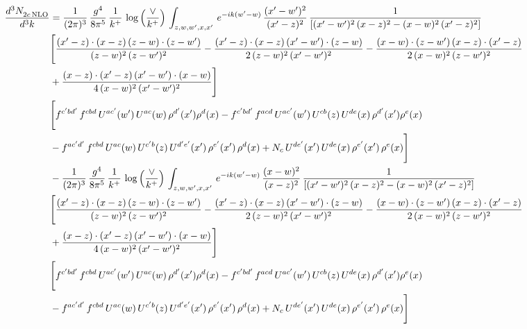 \documentclass[9pt]{article}
\numberwithin{equation}{section}
\begin{document}
\begin{align}
    \frac{d^{3}N_{2c\,\rm NLO}^{\rm}}{d^{3}k}  & =  \frac{1}{(2\pi)^{3}}\, \frac{g^{4}}{8\pi^{5}}\,\frac{1}{k^{+}}\,\log{\left(\frac{\vee}{k^{+}}\right)} \,\int_{z,w,w^{\prime},x,x'}\, e^{-ik(w^{\prime}-w)}\,\frac{(x'-w')^{2}}{(x'-z)^{2}}\, \frac{1}{\left[(x'-w')^{2}\, (x-z)^{2} - (x-w)^{2}\, (x'-z)^{2}\right]} \notag \\ & \Bigg[\frac{(x'-z)\cdot (x-z)\, (z-w)\cdot (z-w')}{(z-w)^{2}\, (z-w')^{2}}-\frac{(x'-z)\cdot (x-z)\, (x'-w')\cdot (z-w)}{2\, (z-w)^{2}\, (x'-w')^{2}} -\frac{(x-w)\cdot (z-w')\, (x-z)\cdot (x'-z)}{2\, (x-w)^{2}\, (z-w')^{2}}\notag \\ & +\frac{(x-z)\cdot (x'-z)\, (x'-w')\cdot (x-w)}{4\, (x-w)^{2}\, (x'-w')^{2}}\Bigg]\notag \\ &  \Bigg[f^{c'bd'}\,f^{cbd}\, U^{ac'}(w')\,U^{ac}(w)\,\rho^{d'}(x')\rho^{d}(x)- f^{c'bd'}\,f^{acd}\,U^{ac'}(w')\,U^{cb}(z)\,U^{de}(x)\,\rho^{d'}(x')\rho^{e}(x) \notag \\ & -f^{ac'd'}\,f^{cbd}\,U^{ac}(w)\,U^{c'b}(z)\,U^{d'e'}(x')\,\rho^{e'}(x')\,\rho^{d}(x) +N_{c}\,U^{de'}(x')\,U^{de}(x)\,\rho^{e'}(x')\,\rho^{e}(x)\Bigg] \notag \\
& -\frac{1}{(2\pi)^{3}}\, \frac{g^{4}}{8\pi^{5}}\,\frac{1}{k^{+}}\,\log{\left(\frac{\vee}{k^{+}}\right)}\,\int_{z,w,w^{\prime},x,x'}\, e^{-ik(w^{\prime}-w)}\,\frac{(x-w)^{2}}{(x-z)^{2}}\, \frac{1}{\left[(x'-w')^{2}\, (x-z)^{2} - (x-w)^{2}\, (x'-z)^{2}\right]} \notag \\ & \Bigg[\frac{(x'-z)\cdot (x-z)\, (z-w)\cdot (z-w')}{(z-w)^{2}\, (z-w')^{2}}-\frac{(x'-z)\cdot (x-z)\, (x'-w')\cdot (z-w)}{2\, (z-w)^{2}\, (x'-w')^{2}} -\frac{(x-w)\cdot (z-w')\, (x-z)\cdot (x'-z)}{2\, (x-w)^{2}\, (z-w')^{2}}\notag \\ & +\frac{(x-z)\cdot (x'-z)\, (x'-w')\cdot (x-w)}{4\, (x-w)^{2}\, (x'-w')^{2}}\Bigg] \notag \\ &  \Bigg[f^{c'bd'}\,f^{cbd}\, U^{ac'}(w')\,U^{ac}(w)\,\rho^{d'}(x')\rho^{d}(x)- f^{c'bd'}\,f^{acd}\,U^{ac'}(w')\,U^{cb}(z)\,U^{de}(x)\,\rho^{d'}(x')\rho^{e}(x) \notag \\ & -f^{ac'd'}\,f^{cbd}\,U^{ac}(w)\,U^{c'b}(z)\,U^{d'e'}(x')\,\rho^{e'}(x')\,\rho^{d}(x) +N_{c}\,U^{de'}(x')\,U^{de}(x)\,\rho^{e'}(x')\,\rho^{e}(x)\Bigg]
\end{align}
\end{document}
